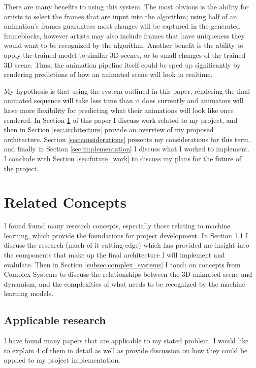 \documentclass[conference]{IEEEtran}
\begin{document}
There are many benefits to using this system. The most obvious is the ability
for artists to select the frames that are input into the algorithm; using half
of an animation's frames guarantees most changes will be captured in the
generated frameblocks, however artists may also include frames that have
uniqueness they would want to be recognized by the algorithm. Another benefit is
the ability to apply the trained model to similar 3D scenes, or to small changes
of the trained 3D scene. Thus, the animation pipeline itself could be sped up
significantly by rendering predictions of how an animated scene will look in
realtime.

My hypothesis is that using the system outlined in this paper, rendering the
final animated sequence will take less time than it does currently and animators will
have more flexibility for predicting what their animations will look like once
rendered. In Section \ref{sec:related_concepts} of this paper I discuss work
related to my project, and then in Section \ref{sec:architecture} provide an overview
of my proposed architecture. Section
\ref{sec:considerations} presents my considerations for this term, and finally
in Section \ref{sec:implementation} I discuss what I worked to implement.
I conclude with Section \ref{sec:future_work} to discuss my plans for the future of
the project.

\section{Related Concepts}
\label{sec:related_concepts}
I found found many research concepts, especially those relating to machine learning,
which provide the foundations for project development.
In Section \ref{subsec:applicable} I discuss the
research (much of it cutting-edge) which has provided me insight into the
components that make up the final architecture I will implement and evalulate.
Then in Section \ref{subsec:complex_systems} I
touch on concepts from Complex Systems to discuss the relationships between
the 3D animated scene and dynamism, and the complexities of what needs to be
recognized by the machine learning models.

\subsection{Applicable research}
\label{subsec:applicable}
I have found many papers that are applicable to my stated problem. I would like
to explain 4 of them in detail as well as provide
discussion on how they could be applied to my project implementation.
\end{document}
